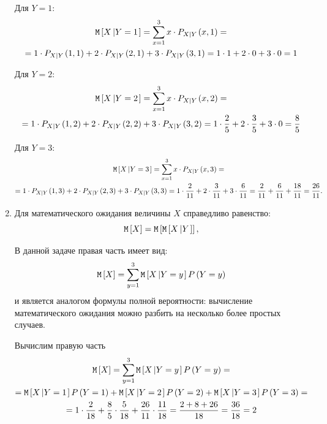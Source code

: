 \begin{enumerate}
    Для $Y=1$:
    \begin{multline}
        \mathtt{M} \left [ X \left | Y=1 \right . \right ]
        = \sum_{x=1}^3 x \cdot P_{X \left | Y \right .}(x, 1) = \\
        = 1 \cdot P_{X \left | Y \right .}(1, 1) + 2 \cdot P_{X \left | Y \right .}(2, 1) + 3 \cdot P_{X \left | Y \right .}(3, 1)
        = 1 \cdot 1 + 2 \cdot 0 + 3 \cdot 0
        = 1
    \end{multline}

    Для $Y=2$:
    \begin{multline}
        \mathtt{M} \left [ X \left | Y=2 \right . \right ]
        = \sum_{x=1}^3 x \cdot P_{X \left | Y \right .}(x, 2) = \\
        = 1 \cdot P_{X \left | Y \right .}(1, 2) + 2 \cdot P_{X \left | Y \right .}(2, 2) + 3 \cdot P_{X \left | Y \right .}(3, 2)
        = 1 \cdot \frac{2}{5} + 2 \cdot \frac{3}{5} + 3 \cdot 0
        = \frac{8}{5}
    \end{multline}

    Для $Y=3$:
    \begin{multline}
        \mathtt{M} \left [ X \left | Y=3 \right . \right ]
        = \sum_{x=1}^3 x \cdot P_{X \left | Y \right .}(x, 3) = \\
        = 1 \cdot P_{X \left | Y \right .}(1, 3) + 2 \cdot P_{X \left | Y \right .}(2, 3) + 3 \cdot P_{X \left | Y \right .}(3, 3)
        = 1 \cdot \frac{2}{11} + 2 \cdot \frac{3}{11} + 3 \cdot \frac{6}{11}
        = \frac{2}{11} + \frac{6}{11} + \frac{18}{11}
        = \frac{26}{11} .
    \end{multline}

    \item Для математического ожидания величины $X$ справедливо равенство:
    \begin{equation}
        \mathtt{M} \left [ X \right ] = \mathtt{M} \left [ \mathtt{M} \left [ X \left | Y \right . \right ] \right ] ,
    \end{equation}

    В данной задаче правая часть имеет вид:
    \begin{equation}
        \mathtt{M} \left [ X \right ] = \sum_{y=1}^3 \mathtt{M} \left [ X \left | Y=y \right . \right ] P \left ( Y=y \right )
    \end{equation}
    и является аналогом формулы полной вероятности: вычисление математического ожидания можно разбить на несколько более простых случаев.

    Вычислим правую часть
    \begin{multline}
        \mathtt{M} \left [ X \right ]
        = \sum_{y=1}^3 \mathtt{M} \left [ X \left | Y=y \right . \right ] P \left ( Y=y \right ) = \\
        = \mathtt{M} \left [ X \left | Y=1 \right . \right ] P \left ( Y=1 \right ) + \mathtt{M} \left [ X \left | Y=2 \right . \right ] P \left ( Y=2 \right ) + \mathtt{M} \left [ X \left | Y=3 \right . \right ] P \left ( Y=3 \right ) = \\
        = 1 \cdot \frac{2}{18} + \frac{8}{5} \cdot \frac{5}{18}  + \frac{26}{11} \cdot \frac{11}{18}
        = \frac{2 + 8 + 26}{18}
        = \frac{36}{18}
        = 2
    \end{multline}
\end{enumerate}

